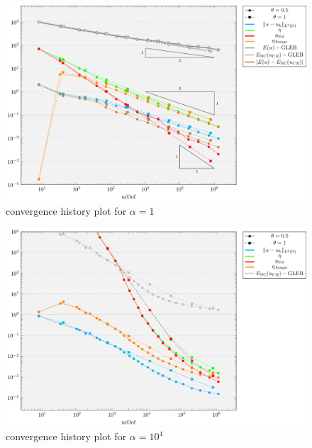 \documentclass[draft=false,twoside,12pt]{scrreprt}
\begin{document}
\vspace{-\parskip}
\begin{figure}[H]
	\centering
	\includegraphics[width=14cm]{tikzPlots/f01/alpha1/convergence.pdf}
  \caption{convergence history plot for $\alpha=1$}
\end{figure}

\vspace{-\parskip}
\begin{figure}[H]
	\centering
	\includegraphics[width=14cm]{tikzPlots/f01/alpha1e4/convergence.pdf}
  \caption{convergence history plot for $\alpha=10^4$}
\end{figure}
\end{document}
